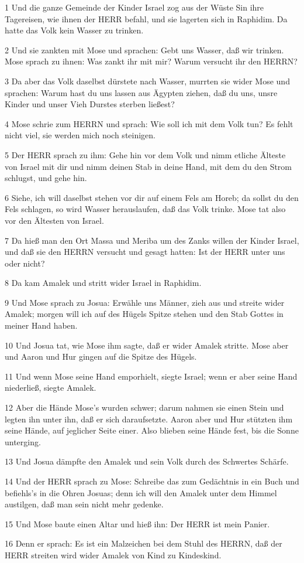\par 1 Und die ganze Gemeinde der Kinder Israel zog aus der Wüste Sin ihre Tagereisen, wie ihnen der HERR befahl, und sie lagerten sich in Raphidim. Da hatte das Volk kein Wasser zu trinken.
\par 2 Und sie zankten mit Mose und sprachen: Gebt uns Wasser, daß wir trinken. Mose sprach zu ihnen: Was zankt ihr mit mir? Warum versucht ihr den HERRN?
\par 3 Da aber das Volk daselbst dürstete nach Wasser, murrten sie wider Mose und sprachen: Warum hast du uns lassen aus Ägypten ziehen, daß du uns, unsre Kinder und unser Vieh Durstes sterben ließest?
\par 4 Mose schrie zum HERRN und sprach: Wie soll ich mit dem Volk tun? Es fehlt nicht viel, sie werden mich noch steinigen.
\par 5 Der HERR sprach zu ihm: Gehe hin vor dem Volk und nimm etliche Älteste von Israel mit dir und nimm deinen Stab in deine Hand, mit dem du den Strom schlugst, und gehe hin.
\par 6 Siehe, ich will daselbst stehen vor dir auf einem Fels am Horeb; da sollst du den Fels schlagen, so wird Wasser herauslaufen, daß das Volk trinke. Mose tat also vor den Ältesten von Israel.
\par 7 Da hieß man den Ort Massa und Meriba um des Zanks willen der Kinder Israel, und daß sie den HERRN versucht und gesagt hatten: Ist der HERR unter uns oder nicht?
\par 8 Da kam Amalek und stritt wider Israel in Raphidim.
\par 9 Und Mose sprach zu Josua: Erwähle uns Männer, zieh aus und streite wider Amalek; morgen will ich auf des Hügels Spitze stehen und den Stab Gottes in meiner Hand haben.
\par 10 Und Josua tat, wie Mose ihm sagte, daß er wider Amalek stritte. Mose aber und Aaron und Hur gingen auf die Spitze des Hügels.
\par 11 Und wenn Mose seine Hand emporhielt, siegte Israel; wenn er aber seine Hand niederließ, siegte Amalek.
\par 12 Aber die Hände Mose's wurden schwer; darum nahmen sie einen Stein und legten ihn unter ihn, daß er sich daraufsetzte. Aaron aber und Hur stützten ihm seine Hände, auf jeglicher Seite einer. Also blieben seine Hände fest, bis die Sonne unterging.
\par 13 Und Josua dämpfte den Amalek und sein Volk durch des Schwertes Schärfe.
\par 14 Und der HERR sprach zu Mose: Schreibe das zum Gedächtnis in ein Buch und befiehls's in die Ohren Josuas; denn ich will den Amalek unter dem Himmel austilgen, daß man sein nicht mehr gedenke.
\par 15 Und Mose baute einen Altar und hieß ihn: Der HERR ist mein Panier.
\par 16 Denn er sprach: Es ist ein Malzeichen bei dem Stuhl des HERRN, daß der HERR streiten wird wider Amalek von Kind zu Kindeskind.

